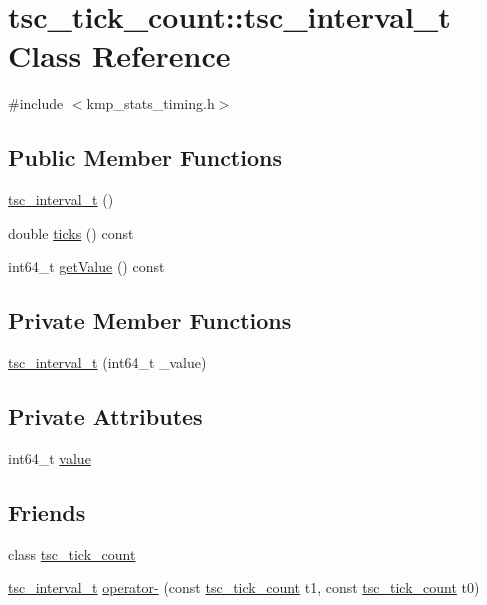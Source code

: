 \hypertarget{classtsc__tick__count_1_1tsc__interval__t}{\section{tsc\-\_\-tick\-\_\-count\-:\-:tsc\-\_\-interval\-\_\-t Class Reference}
\label{classtsc__tick__count_1_1tsc__interval__t}
}


{\ttfamily \#include $<$kmp\-\_\-stats\-\_\-timing.\-h$>$}

\subsection*{Public Member Functions}
\begin{DoxyCompactItemize}
\item 
\hyperlink{classtsc__tick__count_1_1tsc__interval__t_a84eb1a898a4a2564e9fc2eb0c1c2a36e}{tsc\-\_\-interval\-\_\-t} ()
\item 
double \hyperlink{classtsc__tick__count_1_1tsc__interval__t_a8b8686cc1a0a03561d9ca47753e9654e}{ticks} () const 
\item 
int64\-\_\-t \hyperlink{classtsc__tick__count_1_1tsc__interval__t_a530a465e298a4978e9057e36bc6cf061}{get\-Value} () const 
\end{DoxyCompactItemize}
\subsection*{Private Member Functions}
\begin{DoxyCompactItemize}
\item 
\hyperlink{classtsc__tick__count_1_1tsc__interval__t_adb96003484baf498fbd8269ad0728930}{tsc\-\_\-interval\-\_\-t} (int64\-\_\-t \-\_\-value)
\end{DoxyCompactItemize}
\subsection*{Private Attributes}
\begin{DoxyCompactItemize}
\item 
int64\-\_\-t \hyperlink{classtsc__tick__count_1_1tsc__interval__t_a3e9e7f09cabe4ad49dd6f7baa166486d}{value}
\end{DoxyCompactItemize}
\subsection*{Friends}
\begin{DoxyCompactItemize}
\item 
class \hyperlink{classtsc__tick__count_1_1tsc__interval__t_a9c099c14d1f7ce1a2666f75ae3a0fa8c}{tsc\-\_\-tick\-\_\-count}
\item 
\hyperlink{classtsc__tick__count_1_1tsc__interval__t}{tsc\-\_\-interval\-\_\-t} \hyperlink{classtsc__tick__count_1_1tsc__interval__t_acfbc52e39f98c78200a540665fb37f61}{operator-\/} (const \hyperlink{classtsc__tick__count}{tsc\-\_\-tick\-\_\-count} t1, const \hyperlink{classtsc__tick__count}{tsc\-\_\-tick\-\_\-count} t0)
\end{DoxyCompactItemize}


